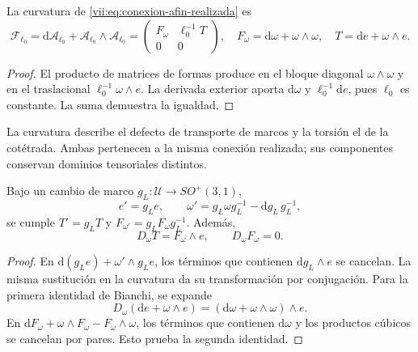 \begin{proposition}
\label{vii:prop:curvatura-afin}
La curvatura de \eqref{vii:eq:conexion-afin-realizada} es
\begin{equation}
 \mathcal F_{\ell_0}
 =\mathrm d\mathcal A_{\ell_0}
   +\mathcal A_{\ell_0}\wedge\mathcal A_{\ell_0}
 =\begin{pmatrix}F_\omega&\ell_0^{-1}T\\0&0\end{pmatrix},
 \quad F_\omega=\mathrm d\omega+\omega\wedge\omega,
 \quad T=\mathrm de+\omega\wedge e.
 \label{vii:eq:curvatura-afin-realizada}
\end{equation}
\end{proposition}
\begin{proof}
El producto de matrices de formas produce en el bloque diagonal
\(\omega\wedge\omega\) y en el traslacional
\(\ell_0^{-1}\omega\wedge e\). La derivada exterior aporta
\(\mathrm d\omega\) y \(\ell_0^{-1}\mathrm de\), pues
\(\ell_0\) es constante. La suma demuestra la igualdad.
\end{proof}

La curvatura describe el defecto de transporte de marcos y la torsión
el de la cotétrada. Ambas pertenecen a la misma conexión realizada;
sus componentes conservan dominios tensoriales distintos.

\begin{proposition}
\label{vii:prop:bianchi-cartan}
Bajo un cambio de marco \(g_L:\mathcal U\to SO^+(3,1)\),
\[
 e'=g_Le,\qquad
 \omega'=g_L\omega g_L^{-1}-\mathrm dg_L\,g_L^{-1},
\]
se cumple \(T'=g_LT\) y \(F_{\omega'}=g_LF_\omega g_L^{-1}\).
Además,
\begin{equation}
 D_\omega T=F_\omega\wedge e,\qquad D_\omega F_\omega=0.
 \label{vii:eq:bianchi-realizacion}
\end{equation}
\end{proposition}
\begin{proof}
En \(\mathrm d(g_Le)+\omega'\wedge g_Le\), los términos
que contienen \(\mathrm dg_L\wedge e\) se cancelan.
La misma sustitución en la curvatura da su transformación por
conjugación. Para la primera identidad de Bianchi, se expande
\[
 D_\omega(\mathrm de+\omega\wedge e)
 =(\mathrm d\omega+\omega\wedge\omega)\wedge e.
\]
En \(\mathrm dF_\omega+\omega\wedge F_\omega-F_\omega\wedge\omega\),
los términos que contienen \(\mathrm d\omega\) y los productos
cúbicos se cancelan por pares. Esto prueba la segunda identidad.
\end{proof}

